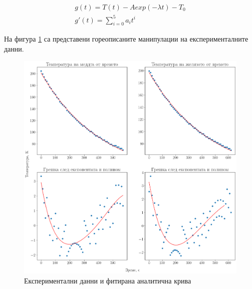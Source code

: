 \documentclass[
 reprint,
 amsmath,amssymb,
 aps,
]{revtex4-2}
\begin{document}
\begin{gather*}
    g(t) = T(t) - A exp(-\lambda t) - T_0 \\ 
    g'(t) = \sum_{i=0}^{5}{a_i t^i}
\end{gather*}

На фигура \ref{fig:1} са представени гореописаните манипулации на експерименталните данни. 

\begin{figure}[ht]
    \centering
    \includegraphics[width=\textwidth, keepaspectratio=true]{fig2.png} 
    \caption{Експериментални данни и фитирана аналитична крива}
    \label{fig:1}
\end{figure}
\end{document}
